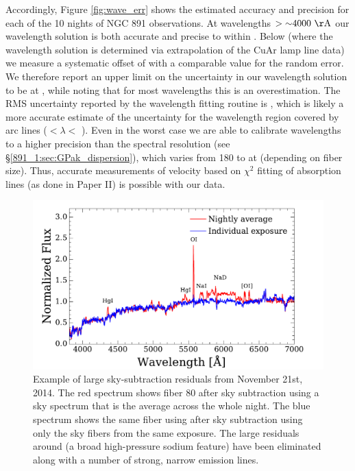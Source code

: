 Accordingly, Figure \ref{fig:wave_err} shows the estimated accuracy
and precision for each of the 10 nights of NGC 891 observations.  At
wavelengths $>\val{\asim 4000}{\AA}$ our wavelength solution is both
accurate and precise to within . Below
 (where the wavelength solution is determined via
extrapolation of the CuAr lamp line data) we measure a systematic
offset of  with a comparable value for the random
error. We therefore report an upper limit on the uncertainty in our
wavelength solution to be  at , while
noting that for most wavelengths this is an overestimation.  The RMS
uncertainty reported by the wavelength fitting routine is , which is likely a more accurate estimate of the
uncertainty for the wavelength region covered by arc lines
($<\lambda <$ ).  Even in the worst case
we are able to calibrate wavelengths to a higher precision than the
spectral resolution (see \S\ref{891_1:sec:GPak_dispersion}), which varies
from 180 to  at  (depending on fiber
size). Thus, accurate measurements of velocity based on $\chi^2$
fitting of absorption lines (as done in Paper II) is possible with our
data.



\begin{figure}
  \centering
  \includegraphics[width=\columnwidth]{891_1/figs/skysub_comp.pdf}
  \caption{\label{fig:skysub_comp}\fixspacing Example of large
    sky-subtraction residuals from November 21st, 2014. The red
    spectrum shows fiber 80 after sky subtraction using a sky spectrum
    that is the average across the whole night. The blue spectrum
    shows the same fiber using after sky subtraction using only the
    sky fibers from the same exposure. The large residuals around
     (a broad high-pressure sodium feature) have been
    eliminated along with a number of strong, narrow emission lines.}
\end{figure}


